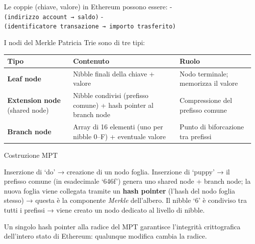 \documentclass[
  italian,
  openany]{book}
\newcounter{none} %
\begin{document}
Le coppie (chiave, valore) in Ethereum possono essere: -
\texttt{(indirizzo\ account\ →\ saldo)} -
\texttt{(identificatore\ transazione\ →\ importo\ trasferito)}

I nodi del Merkle Patricia Trie sono di tre tipi:

{\def\LTcaptype{none} %
\begin{longtable}[]{@{}
  >{\raggedright\arraybackslash}p{}
  >{\raggedright\arraybackslash}p{}
  >{\raggedright\arraybackslash}p{}@{}}
\toprule\noalign{}
\begin{minipage}[b]{\linewidth}\raggedright
Tipo
\end{minipage} & \begin{minipage}[b]{\linewidth}\raggedright
Contenuto
\end{minipage} & \begin{minipage}[b]{\linewidth}\raggedright
Ruolo
\end{minipage} \\
\midrule\noalign{}
\endhead
\bottomrule\noalign{}
\endlastfoot
\textbf{Leaf node} & Nibble finali della chiave + valore & Nodo
terminale; memorizza il valore \\
\textbf{Extension node} (shared node) & Nibble condivisi (prefisso
comune) + hash pointer al branch node & Compressione del prefisso
comune \\
\textbf{Branch node} & Array di 16 elementi (uno per nibble 0--F) +
eventuale valore & Punto di biforcazione tra prefissi \\
\end{longtable}
}

\begin{callouttip}{Costruzione MPT}

Inserzione di `do' → creazione di un nodo foglia. Inserzione di `puppy'
→ il prefisso comune (in esadecimale `646f') genera uno shared node +
branch node; la nuova foglia viene collegata tramite un \textbf{hash
pointer} (l'hash del nodo foglia stesso) → questa è la componente
\emph{Merkle} dell'albero. Il nibble `6' è condiviso tra tutti i
prefissi → viene creato un nodo dedicato al livello di nibble.

\end{callouttip}

Un singolo hash pointer alla radice del MPT garantisce l'integrità
crittografica dell'intero stato di Ethereum: qualunque modifica cambia
la radice.
\end{document}
